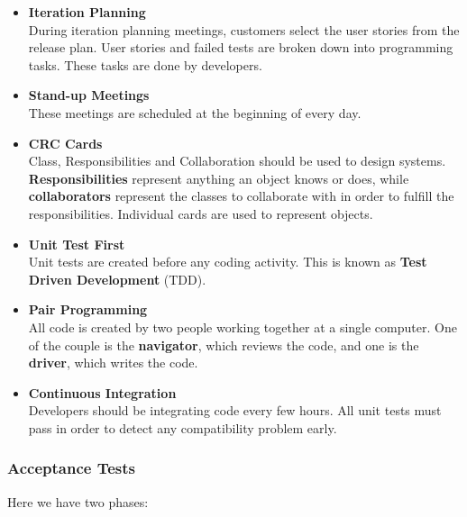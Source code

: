 \documentclass{article}
\begin{document}
\begin{itemize}
	\item \textbf{Iteration Planning}
	\vspace{.2cm} \\
	During iteration planning meetings, customers select the user stories from the release plan. User stories and failed tests are broken down into programming tasks. These tasks are done by developers.
	
	\item \textbf{Stand-up Meetings}
	\vspace{.2cm} \\
	These meetings are scheduled at the beginning of every day.
	
	\item \textbf{CRC Cards}
	\vspace{.2cm} \\
	Class, Responsibilities and Collaboration should be used to design systems. \textbf{Responsibilities} represent anything an object knows or does, while \textbf{collaborators} represent the classes to collaborate with in order to fulfill the responsibilities. Individual cards are used to represent objects.
	
	\item \textbf{Unit Test First}
	\vspace{.2cm} \\
	Unit tests are created before any coding activity. This is known as \textbf{Test Driven Development} (TDD).
	
	\item \textbf{Pair Programming}
	\vspace{.2cm} \\
	All code is created by two people working together at a single computer. One of the couple is the \textbf{navigator}, which reviews the code, and one is the \textbf{driver}, which writes the code.
	
	\item \textbf{Continuous Integration}
	\vspace{.2cm} \\
	Developers should be integrating code every few hours. All unit tests must pass in order to detect any compatibility problem early.
\end{itemize}

\subsubsection{Acceptance Tests}
Here we have two phases:
\end{document}
